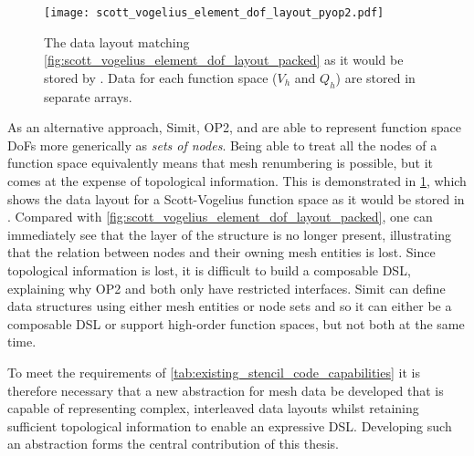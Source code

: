 \documentclass[thesis]{subfiles}
\begin{document}
\begin{figure}
  \centering
  \texttt{[image: scott\_vogelius\_element\_dof\_layout\_pyop2.pdf]}
  \caption{
    The data layout matching \cref{fig:scott_vogelius_element_dof_layout_packed} as it would be stored by .
    Data for each function space ($V_h$ and $Q_h$) are stored in separate arrays.
  }
  \label{fig:scott_vogelius_element_dof_layout_pyop2}
\end{figure}

As an alternative approach, Simit, OP2, and  are able to represent function space DoFs more generically as \emph{sets of nodes}.
Being able to treat all the nodes of a function space equivalently means that mesh renumbering is possible, but it comes at the expense of topological information.
This is demonstrated in \cref{fig:scott_vogelius_element_dof_layout_pyop2}, which shows the data layout for a Scott-Vogelius function space as it would be stored in .
Compared with \cref{fig:scott_vogelius_element_dof_layout_packed}, one can immediately see that the  layer of the structure is no longer present, illustrating that the relation between nodes and their owning mesh entities is lost.
Since topological information is lost, it is difficult to build a composable DSL, explaining why OP2 and  both only have restricted interfaces.
Simit can define data structures using either mesh entities or node sets and so it can either be a composable DSL or support high-order function spaces, but not both at the same time.

To meet the requirements of \cref{tab:existing_stencil_code_capabilities} it is therefore necessary that a new abstraction for mesh data be developed that is capable of representing complex, interleaved data layouts whilst retaining sufficient topological information to enable an expressive DSL.
Developing such an abstraction forms the central contribution of this thesis.
\end{document}
